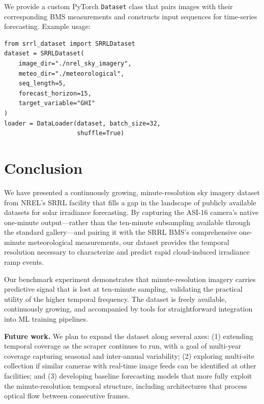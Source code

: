 \documentclass[twoside,11pt]{article}
\begin{document}
We provide a custom PyTorch \texttt{Dataset} class that pairs images with their corresponding BMS measurements and constructs input sequences for time-series forecasting. Example usage:

\begin{lstlisting}
from srrl_dataset import SRRLDataset
dataset = SRRLDataset(
    image_dir="./nrel_sky_imagery",
    meteo_dir="./meteorological",
    seq_length=5,
    forecast_horizon=15,
    target_variable="GHI"
)
loader = DataLoader(dataset, batch_size=32,
                    shuffle=True)
\end{lstlisting}

\section{Conclusion}
\label{sec:conclusion}

We have presented a continuously growing, minute-resolution sky imagery dataset from NREL's SRRL facility that fills a gap in the landscape of publicly available datasets for solar irradiance forecasting. By capturing the ASI-16 camera's native one-minute output---rather than the ten-minute subsampling available through the standard gallery---and pairing it with the SRRL BMS's comprehensive one-minute meteorological measurements, our dataset provides the temporal resolution necessary to characterize and predict rapid cloud-induced irradiance ramp events.

Our benchmark experiment demonstrates that minute-resolution imagery carries predictive signal that is lost at ten-minute sampling, validating the practical utility of the higher temporal frequency. The dataset is freely available, continuously growing, and accompanied by tools for straightforward integration into ML training pipelines.

\textbf{Future work.} We plan to expand the dataset along several axes: (1) extending temporal coverage as the scraper continues to run, with a goal of multi-year coverage capturing seasonal and inter-annual variability; (2) exploring multi-site collection if similar cameras with real-time image feeds can be identified at other facilities; and (3) developing baseline forecasting models that more fully exploit the minute-resolution temporal structure, including architectures that process optical flow between consecutive frames.

\end{document}
